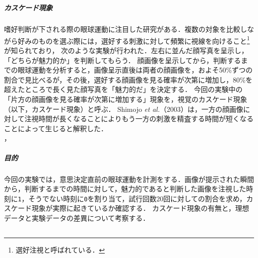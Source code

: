 \chapter{\kadaia}
\section{\purpose}
\paragraph{カスケード現象}
嗜好判断が下される際の眼球運動に注目した研究がある．複数の対象を比較しながら好みのものを選ぶ際には，選好する刺激に対して頻繁に視線を向けること\footnote{選好注視と呼ばれている．}が知られており，
次のような実験が行われた．左右に並んだ顔写真を呈示し，「どちらが魅力的か」を判断してもらう．
顔画像を呈示してから，判断するまでの眼球運動を分析すると，画像呈示直後は両者の顔画像を，およそ50\%ずつの割合で見比べるが，その後，選好する顔画像を見る確率が次第に増加し，80\%を超えたところで長く見た顔写真を「魅力的だ」を決定する．
今回の実験中の「片方の顔画像を見る確率が次第に増加する」現象を，視覚のカスケード現象（以下，カスケード現象）と呼ぶ．
Shimojo \textit{et al.}（2003）は，一方の顔画像に対して注視時間が長くなることによりもう一方の刺激を精査する時間が短くなることによって生じると解釈した．\\
\hfill\cite[p.202]{美感}，\cite{潜在呈示した情報が選択判断時の視線の動きに与える影響}\par
\paragraph{目的}今回の実験では，意思決定直前の眼球運動を計測をする．画像が提示された瞬間から，判断するまでの時間に対して，魅力的であると判断した画像を注視した時刻に\texttt{1}，そうでない時刻に\texttt{0}を割り当て，試行回数20回に対しての割合を求め，カスケード現象が実際に起きているか確認する．
カスケード現象の有無と，理想データと実験データの差異について考察する．
\section{\method}
\newcommand{\elt}{\texttt{Eye Link Ⅱ}}
\newcommand{\csv}{\texttt{CSV}}
